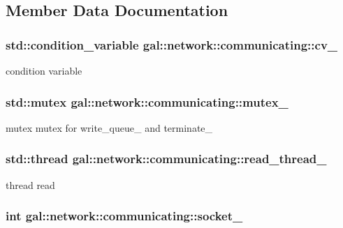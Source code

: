 \subsection{\-Member \-Data \-Documentation}
\hypertarget{classgal_1_1network_1_1communicating_aff2d38da260c4e5f9182eec6f8bc16bd}{
\subsubsection[{cv\-\_\-}]{\setlength{\rightskip}{0pt plus 5cm}std\-::condition\-\_\-variable {\bf gal\-::network\-::communicating\-::cv\-\_\-}}}\label{classgal_1_1network_1_1communicating_aff2d38da260c4e5f9182eec6f8bc16bd}
condition variable \hypertarget{classgal_1_1network_1_1communicating_a7afe6898e58ca9087f05124cf4d18b65}{
\subsubsection[{mutex\-\_\-}]{\setlength{\rightskip}{0pt plus 5cm}std\-::mutex {\bf gal\-::network\-::communicating\-::mutex\-\_\-}}}\label{classgal_1_1network_1_1communicating_a7afe6898e58ca9087f05124cf4d18b65}
mutex mutex for write\-\_\-queue\-\_\- and terminate\-\_\- \hypertarget{classgal_1_1network_1_1communicating_a2d94e9fcd2cd765768b354a87b726bf3}{
\subsubsection[{read\-\_\-thread\-\_\-}]{\setlength{\rightskip}{0pt plus 5cm}std\-::thread {\bf gal\-::network\-::communicating\-::read\-\_\-thread\-\_\-}}}\label{classgal_1_1network_1_1communicating_a2d94e9fcd2cd765768b354a87b726bf3}
thread read \hypertarget{classgal_1_1network_1_1communicating_afe5f9de9e2535e261c78485dec4d9e82}{
\subsubsection[{socket\-\_\-}]{\setlength{\rightskip}{0pt plus 5cm}int {\bf gal\-::network\-::communicating\-::socket\-\_\-}}}\label{classgal_1_1network_1_1communicating_afe5f9de9e2535e261c78485dec4d9e82}
